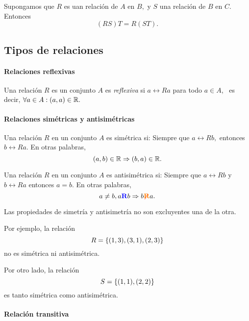	\begin{teorema}
		Supongamos que $R$ es uan relación de $A$ en $B,$ y $S$ una relación de $B$ en $C.$ Entonces
		$$
		(RS)T=R(ST).
		$$
	\end{teorema}



\subsection{Tipos de relaciones}

\paragraph{Relaciones reflexivas}



	Una relación $R$ es un conjunto $A$ es \emph{reflexiva} si $a\rel{R}a$ para todo $a\in A$, \, es decir, $\forall a \in A: (a,a)\in \mathbb{R}.$




\paragraph{Relaciones sim\'etricas y antisim\'etricas}


	Una relación $R$ en un conjunto $A$ es sim\'etrica si: Siempre que $a\rel{R}b,$ entonces $b\rel{R}a.$  En otras palabras,
	$$
	(a,b)\in \mathbb{R} \Rightarrow (b,a)\in \mathbb{R}.
	$$





	Una relación $R$ en un conjunto $A$ es antisim\'etrica si: Siempre que $a\rel{R}b$ y $b\rel{R}a$ entonces $a=b.$  En otras palabras,
	$$
	a\neq b, a{ {\color{blue}\textbf{R}} }b \Rightarrow b{ {\color{red}\not}{\color{orange}\textbf{R}} }a.
	$$



	\begin{observacion}
		Las propiedades de simetría y antisimetría no son excluyentes una de la otra.

		Por ejemplo, la relación $$R=\left\{ (1,3),(3,1),(2,3) \right\}$$ no es sim\'etrica ni antisim\'etrica.

		Por otro lado, la relación $$S=\left\{ (1,1),(2,2) \right\}$$ es tanto sim\'etrica como antisim\'etrica.
	\end{observacion}



\paragraph{Relación transitiva}


